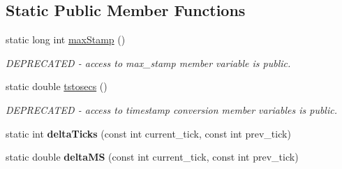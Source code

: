 \subsection*{Static Public Member Functions}
\begin{DoxyCompactItemize}
\item 
\mbox{\label{classev_1_1vtsHelper_aa7f1c13eb051773e9413b52bb52caad0}} 
static long int \hyperlink{classev_1_1vtsHelper_aa7f1c13eb051773e9413b52bb52caad0}{max\+Stamp} ()
\begin{DoxyCompactList}\small\item\em D\+E\+P\+R\+E\+C\+A\+T\+ED -\/ access to max\+\_\+stamp member variable is public. \end{DoxyCompactList}\item 
\mbox{\label{classev_1_1vtsHelper_a07d0dc3cd7743eff7d594e838ae23a01}} 
static double \hyperlink{classev_1_1vtsHelper_a07d0dc3cd7743eff7d594e838ae23a01}{tstosecs} ()
\begin{DoxyCompactList}\small\item\em D\+E\+P\+R\+E\+C\+A\+T\+ED -\/ access to timestamp conversion member variables is public. \end{DoxyCompactList}\item 
\mbox{\label{classev_1_1vtsHelper_a49e6d2f2f4c93f2ba8935630735c6fa5}} 
static int {\bfseries delta\+Ticks} (const int current\+\_\+tick, const int prev\+\_\+tick)
\item 
\mbox{\label{classev_1_1vtsHelper_a398f00887ff3412590800a800ce6a052}} 
static double {\bfseries delta\+MS} (const int current\+\_\+tick, const int prev\+\_\+tick)
\end{DoxyCompactItemize}

